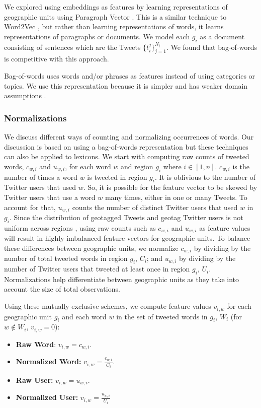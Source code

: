 \documentclass[letterpaper]{article}
\begin{document}
We explored using embeddings as features by learning representations of geographic units using Paragraph Vector \cite{le2014distributed}. This is a similar technique to Word2Vec \cite{mikolov2013distributed}, but rather than learning representations of words, it learns representations of paragraphs or documents. We model each $g_i$ as a document consisting of sentences which are the Tweets $\{t_i^j\}_{j=1}^{N_i}$. We found that bag-of-words is competitive with this approach.

Bag-of-words uses words and/or phrases as features instead of using categories or topics. We use this representation because it is simpler and has weaker domain assumptions \cite{o2011computational}.

\subsubsection{Normalizations} We discuss different ways of counting and normalizing occurrences of words. Our discussion is based on using a bag-of-words representation but these techniques can also be applied to lexicons. We start with computing raw counts of tweeted words, $c_{w,i}$ and $u_{w,i}$, for each word $w$ and region $g_i$ where $i \in [1,n]$. $c_{w,i}$ is the number of times a word $w$ is tweeted in region $g_i$. It is oblivious to the number of Twitter users that used $w$. So, it is possible for the feature vector to be skewed by Twitter users that use a word $w$ many times, either in one or many Tweets. To account for that, $u_{w,i}$ counts the number of distinct Twitter users that used $w$ in $g_i$. Since the distribution of geotagged Tweets and geotag Twitter users is not uniform across regions \cite{malik2015population}, using raw counts such as $c_{w,i}$ and $u_{w,i}$ as feature values will result in highly imbalanced feature vectors for geographic units. To balance these differences between geographic units, we normalize $c_{w,i}$ by dividing by the number of total tweeted words in region $g_i$, $C_i$; and $u_{w,i}$ by dividing by the number of Twitter users that tweeted at least once in region $g_i$, $U_i$. Normalizations help differentiate between geographic units as they take into account the size of total observations.

Using these mutually exclusive schemes, we compute feature values $v_{i,w}$ for each geographic unit $g_i$ and each word $w$ in the set of tweeted words in $g_i$, $W_i$ (for $w \notin W_i$, $v_{i,w} = 0$):
\begin{itemize}
\item \textbf{Raw Word}: $v_{i,w} = c_{w,i}$.
\item \textbf{Normalized Word:} $v_{i,w} = \frac{c_{w,i}}{C_i}$.
\item \textbf{Raw User:} $v_{i,w} = u_{w,i}$.
\item \textbf{Normalized User:} $v_{i,w} = \frac{u_{w,i}}{U_i}$
\end{itemize}
\end{document}
